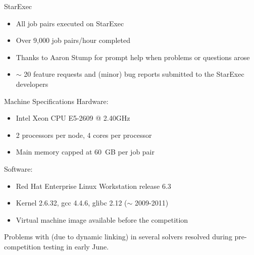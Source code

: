 \documentclass{beamer}
\begin{document}

\begin{frame}{StarExec}
  \begin{itemize}
  \item All job pairs executed on StarExec
  \item Over 9,000 job pairs/hour completed
  \end{itemize}

  \medskip
  
  \begin{center}
    {\Large{}}
  \end{center}

  \medskip
  
  \begin{itemize}
  \item Thanks to Aaron Stump for prompt help when problems or
    questions arose
  \item $\sim$ 20 feature requests and (minor) bug reports submitted
    to the StarExec developers
  \end{itemize}
\end{frame}


\begin{frame}{Machine Specifications}
  Hardware:
  \begin{itemize}
  \item Intel Xeon CPU E5-2609 @ 2.40GHz
  \item 2 processors per node, 4 cores per processor
  \item Main memory capped at 60~GB per job pair
  \end{itemize}

  \medskip
  
  Software:
  \begin{itemize}
  \item Red Hat Enterprise Linux Workstation release 6.3
  \item Kernel 2.6.32, gcc 4.4.6, glibc 2.12 ($\sim$ 2009-2011)
  \item Virtual machine image available before the competition
  \end{itemize}

  \bigskip
  
  Problems with  (due to dynamic linking)
  in several solvers resolved during pre-competition testing in early
  June.
\end{frame}
\end{document}
